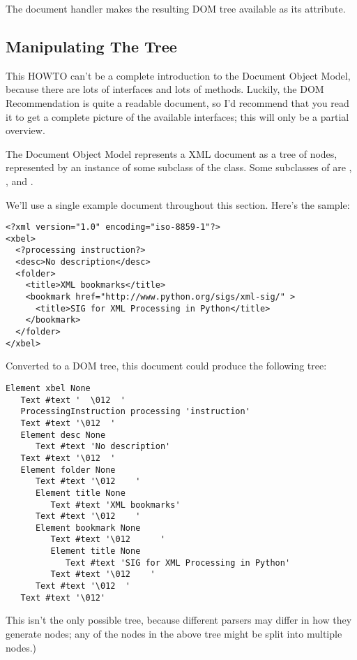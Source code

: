 \documentclass{howto}
\begin{document}
The  document handler makes the resulting DOM tree
available as its  attribute.  

\subsection{Manipulating The Tree}

This HOWTO can't be a complete introduction to the Document Object
Model, because there are lots of interfaces and lots of
methods. Luckily, the DOM Recommendation is quite a readable document,
so I'd recommend that you read it to get a complete picture of the
available interfaces; this will only be a partial overview.

The Document Object Model represents a XML document as a tree of
nodes, represented by an instance of some subclass of the 
class.  Some subclasses of  are ,
, and .  

We'll use a single example document throughout this section.  Here's the sample:

\begin{verbatim}
<?xml version="1.0" encoding="iso-8859-1"?>
<xbel>  
  <?processing instruction?>
  <desc>No description</desc>
  <folder>
    <title>XML bookmarks</title>
    <bookmark href="http://www.python.org/sigs/xml-sig/" >
      <title>SIG for XML Processing in Python</title>
    </bookmark>
  </folder>
</xbel>
\end{verbatim}

Converted to a DOM tree, this document could produce the following tree:

\begin{verbatim}
Element xbel None
   Text #text '  \012  '
   ProcessingInstruction processing 'instruction'
   Text #text '\012  '
   Element desc None
      Text #text 'No description'
   Text #text '\012  '
   Element folder None
      Text #text '\012    '
      Element title None
         Text #text 'XML bookmarks'
      Text #text '\012    '
      Element bookmark None
         Text #text '\012      '
         Element title None
            Text #text 'SIG for XML Processing in Python'
         Text #text '\012    '
      Text #text '\012  '
   Text #text '\012'
\end{verbatim}

This isn't the only possible tree, because different parsers may
differ in how they generate  nodes; any of the
 nodes in the above tree might be split into multiple nodes.)
\end{document}
